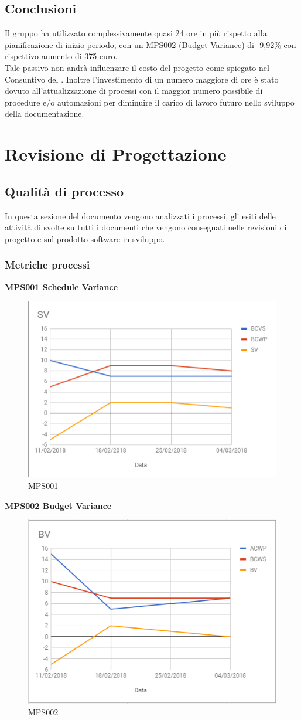 \documentclass[PianoDiQualifica.tex]{subfiles}
\begin{document}
\subsection{Conclusioni}
Il gruppo ha utilizzato complessivamente quasi 24 ore in più rispetto alla pianificazione di inizio periodo, con un MPS002 (Budget Variance) di -9,92\% con rispettivo aumento di 375 euro.\\
Tale passivo non andrà influenzare il costo del progetto come spiegato nel Consuntivo del \pdp{}.
Inoltre l'investimento di un numero maggiore di ore è stato dovuto all'attualizzazione di processi con il maggior numero possibile di procedure e/o automazioni per diminuire il carico di lavoro futuro nello sviluppo della documentazione.

	
\section{Revisione di Progettazione}
	
\subsection{Qualità di processo}
In questa sezione del documento vengono analizzati i processi, gli esiti delle attività di  svolte su tutti i documenti che vengono consegnati nelle revisioni di progetto e sul prodotto software in sviluppo.

\subsubsection{Metriche processi}

\textbf{MPS001 Schedule Variance}
\begin{figure}[H]
	\centering
	\includegraphics[width=0.5\linewidth]{RP/SV}
	\caption{MPS001}
	\label{fig:processi}
\end{figure}

\textbf{MPS002 Budget Variance}
\begin{figure}[H]
	\centering
	\includegraphics[width=0.5\linewidth]{RP/BV}
	\caption{MPS002}
	\label{fig:processi}
\end{figure}
\end{document}
